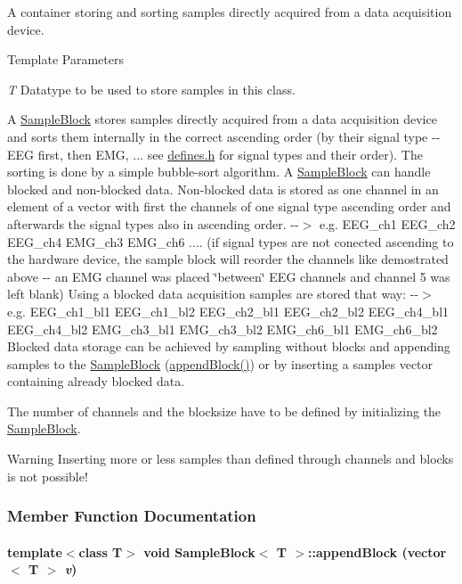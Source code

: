 A container storing and sorting samples directly acquired from a data acquisition device. 
\begin{DoxyTemplParams}{Template Parameters}
\item[{\em T}]Datatype to be used to store samples in this class.\end{DoxyTemplParams}
A \hyperlink{class_sample_block}{SampleBlock} stores samples directly acquired from a data acquisition device and sorts them internally in the correct ascending order (by their signal type -\/-\/ EEG first, then EMG, ... see \hyperlink{defines_8h}{defines.h} for signal types and their order). The sorting is done by a simple bubble-\/sort algorithm. A \hyperlink{class_sample_block}{SampleBlock} can handle blocked and non-\/blocked data. Non-\/blocked data is stored as one channel in an element of a vector with first the channels of one signal type ascending order and afterwards the signal types also in ascending order. -\/-\/$>$ e.g. EEG\_\-ch1 EEG\_\-ch2 EEG\_\-ch4 EMG\_\-ch3 EMG\_\-ch6 .... (if signal types are not conected ascending to the hardware device, the sample block will reorder the channels like demostrated above -\/-\/ an EMG channel was placed \char`\"{}between\char`\"{} EEG channels and channel 5 was left blank) Using a blocked data acquisition samples are stored that way: -\/-\/$>$ e.g. EEG\_\-ch1\_\-bl1 EEG\_\-ch1\_\-bl2 EEG\_\-ch2\_\-bl1 EEG\_\-ch2\_\-bl2 EEG\_\-ch4\_\-bl1 EEG\_\-ch4\_\-bl2 EMG\_\-ch3\_\-bl1 EMG\_\-ch3\_\-bl2 EMG\_\-ch6\_\-bl1 EMG\_\-ch6\_\-bl2 Blocked data storage can be achieved by sampling without blocks and appending samples to the \hyperlink{class_sample_block}{SampleBlock} (\hyperlink{class_sample_block_afad40888932bc8378a7598fd2546317c}{appendBlock()}) or by inserting a samples vector containing already blocked data.

The number of channels and the blocksize have to be defined by initializing the \hyperlink{class_sample_block}{SampleBlock}. \begin{DoxyWarning}{Warning}
Inserting more or less samples than defined through channels and blocks is not possible! 
\end{DoxyWarning}


\subsubsection{Member Function Documentation}
\hypertarget{class_sample_block_afad40888932bc8378a7598fd2546317c}{
\paragraph[{appendBlock}]{\setlength{\rightskip}{0pt plus 5cm}template$<$class T$>$ void {\bf SampleBlock}$<$ T $>$::appendBlock (vector$<$ T $>$ {\em v})}\hfill}
\label{class_sample_block_afad40888932bc8378a7598fd2546317c}


